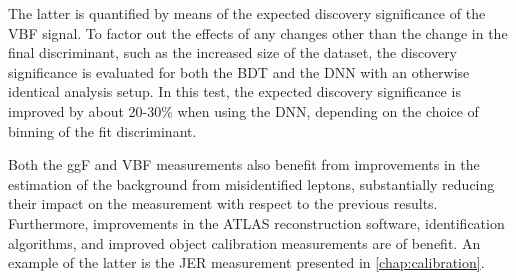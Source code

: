 The latter is quantified by means of the expected discovery significance of the VBF signal.
To factor out the effects of any changes other than the change in the final discriminant, such as the increased size of the dataset, the discovery significance is evaluated for both the BDT and the DNN with an otherwise identical analysis setup. In this test, the expected discovery significance is improved by about 20-30\% when using the DNN, depending on the choice of binning of the fit discriminant. 

Both the ggF and VBF measurements also benefit from improvements in the estimation of the background from misidentified leptons, substantially reducing their impact on the measurement with respect to the previous results. 
Furthermore, improvements in the ATLAS reconstruction software, identification algorithms, and improved object calibration measurements are of benefit. 
An example of the latter is the JER measurement presented in \cref{chap:calibration}. 

